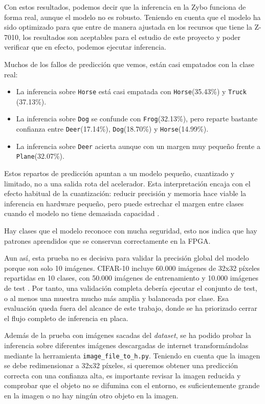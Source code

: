 Con estos resultados, podemos decir que la inferencia en la Zybo funciona de forma real,
aunque el modelo no es robusto.
Teniendo en cuenta que el modelo ha sido optimizado para que entre de manera ajustada en los
recursos que tiene la Z-7010, los resultados son aceptables para el estudio de este proyecto y
poder verificar que en efecto, podemos ejecutar inferencia.

Muchos de los fallos de predicción que vemos, están casi empatados con la clase real:
\begin {itemize}
\item La inferencia sobre \texttt{Horse} está casi empatada con \texttt{Horse}(35.43\%) y
\texttt{Truck} (37.13\%).
\item La inferencia sobre \texttt{Dog} se confunde con \texttt{Frog}(32.13\%), pero reparte
bastante confianza entre \texttt{Deer}(17.14\%), \texttt{Dog}(18.70\%) y
\texttt{Horse}(14.99\%).
\item La inferencia sobre \texttt{Deer} acierta aunque con un margen muy pequeño frente a
\texttt{Plane}(32.07\%).
\end{itemize}

Estos repartos de predicción apuntan a un modelo pequeño, cuantizado y limitado, no a una salida
rota del acelerador. Esta interpretación encaja con el efecto habitual de la cuantización: reducir
precisión y memoria hace viable la inferencia en hardware pequeño, pero puede estrechar el margen
entre clases cuando el modelo no tiene demasiada capacidad \citep{Jacob_2018_CVPR}.

Hay clases que el modelo reconoce con mucha seguridad, esto nos indica que hay patrones aprendidos
que se conservan correctamente en la \ac{FPGA}.

Aun así, esta prueba no es decisiva para validar la precisión global del modelo porque son solo
10 imágenes. \ac{CIFAR}-10 incluye 60.000 imágenes de 32x32 píxeles repartidas en 10
clases, con 50.000
imágenes de entrenamiento y 10.000 imágenes de test \citep{cifar10Dataset}. Por tanto, una
validación completa debería ejecutar el conjunto de test, o al menos una muestra mucho más amplia y
balanceada por clase. Esa evaluación queda fuera del alcance de este trabajo, donde se ha priorizado
cerrar el flujo completo de inferencia en placa.

Además de la prueba con imágenes sacadas del \textit{dataset}, se ha podido probar la
inferencia sobre
diferentes imágenes descargadas de internet transformándolas mediante la herramienta
\texttt{image\_file\_to\_h.py}.
Teniendo en cuenta que la imagen se debe redimensionar a 32x32 píxeles, si queremos obtener una
predicción correcta con una confianza alta, es importante revisar la imagen reducida y comprobar
que el objeto no se difumina con el entorno, es suficientemente grande en la imagen o no hay
ningún otro objeto en la imagen.

